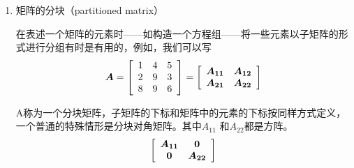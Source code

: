 \begin{enumerate} [1、]
		同样地可得
		\begin{eqnarray}
		\frac{\partial \boldsymbol{A x}}{\partial \boldsymbol{x}}  =  \boldsymbol{A^{\prime}}  \notag
		\end{eqnarray}
		
		如果A是对称矩阵，那么
		\begin{eqnarray}
		\frac{\partial \boldsymbol{ x^{\prime} A x} }{\partial \boldsymbol{x}}  = 2 \boldsymbol{ A x } = \left( \boldsymbol{ A+A^{\prime} }\right) x \notag
		\end{eqnarray}
		
		{\bf 思考题：}
		
		1、证明：$ {tr}\left( \boldsymbol{ A A^{\prime} }\right) = \sum_{j = 1}^{n} \sum_{j=1}^{n} a_{i j}^{2} $
		
		2、证明矩阵$ \boldsymbol{M^{0}} $是幂等矩阵。
		
		3、如果$  L_{1} $、 $L_{2} \cdots L_{\mathrm{n}}  $ 的百分比变动较小$   \Delta L_{1}, \cdots \Delta L_{n} $
		
		如果 $  Y_{1}$ 、$ Y_{2} \cdots Y_{\mathrm{m}} $  巾百分比变动较小 $  \Delta Y_{1}, \cdots \Delta Y_{m} $
		则如下计算公式是否可行？
		
		\quad a) $  \Delta\left(L_{1}, L_{2} \cdots L_{n}\right) \approx \sum_{i=1}^{n} \Delta L_{i}  $
		
		\quad b) $  \Delta\left(\dfrac{Y_{1} \cdots Y_{m}}{L_{1} \cdots L_{n}}\right) \approx \sum_{i=1}^{m} \Delta Y_{i}-\sum_{i=1}^{n} \Delta L_{i}  $
	\item 矩阵的分块（partitioned matrix）
	
		在表述一个矩阵的元素时——如构造一个方程组——将一些元素以子矩阵的形式进行分组有时是有用的，例如，我们可以写
       \vspace{-0.5em}
		\begin{eqnarray}
		\boldsymbol{A}  =  \left[\begin{array}{lll}
		1 & 4 & 5 \\
		2 & 9 & 3 \\
		8 & 9 & 6
		\end{array}\right]  \notag =  \left[\begin{array}{ll}
			\boldsymbol{A_{11}} & \boldsymbol{A_{12}} \\
			\boldsymbol{A_{21}} & \boldsymbol{A_{22}}
		\end{array}\right]  \notag
		\end{eqnarray}
		
		A称为一个分块矩阵，子矩阵的下标和矩阵中的元素的下标按同样方式定义，一个普通的特殊情形是分块对角矩阵。其中$A_{11}
		$ 和$ A_{22} $都是方阵。
		\begin{eqnarray}
		\left[\begin{array}{cc}
			\boldsymbol{A_{11}} & \boldsymbol{0} \\
			\boldsymbol{0} & \boldsymbol{A_{22}}
		\end{array}\right]  \notag
		\end{eqnarray}
		

\end{enumerate}
